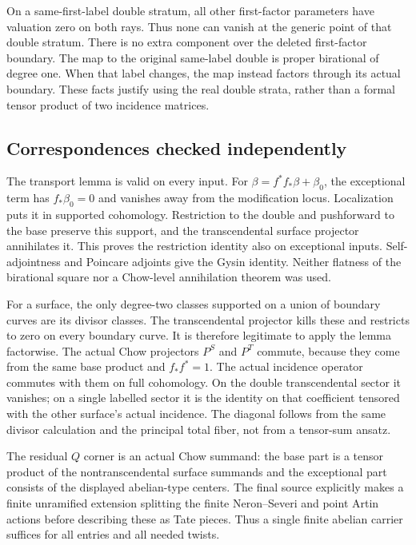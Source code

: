 On a same-first-label double stratum, all other first-factor
parameters have valuation zero on both rays.  Thus none can vanish
at the generic point of that double stratum.  There is no extra
component over the deleted first-factor boundary.  The map to the
original same-label double is proper birational of degree one.
When that label changes, the map instead factors through its actual
boundary.  These facts justify using the real double strata, rather
than a formal tensor product of two incidence matrices.

\subsection{Correspondences checked independently}

The transport lemma is valid on every input.  For
$\beta=f^*f_*\beta+\beta_0$, the exceptional term has
$f_*\beta_0=0$ and vanishes away from the modification locus.
Localization puts it in supported cohomology.  Restriction to the
double and pushforward to the base preserve this support, and the
transcendental surface projector annihilates it.  This proves the
restriction identity also on exceptional inputs.  Self-adjointness
and Poincare adjoints give the Gysin identity.  Neither flatness of
the birational square nor a Chow-level annihilation theorem was used.

For a surface, the only degree-two classes supported on a union of
boundary curves are its divisor classes.  The transcendental
projector kills these and restricts to zero on every boundary curve.
It is therefore legitimate to apply the lemma factorwise.
The actual Chow projectors $P^S$ and $P^T$ commute, because they
come from the same base product and $f_*f^*=1$.  The actual incidence
operator commutes with them on full cohomology.  On the double
transcendental sector it vanishes; on a single labelled sector it is
the identity on that coefficient tensored with the other surface's
actual incidence.  The diagonal follows from the same divisor
calculation and the principal total fiber, not from a tensor-sum
ansatz.

The residual $Q$ corner is an actual Chow summand: the base part is
a tensor product of the nontranscendental surface summands and the
exceptional part consists of the displayed abelian-type centers.
The final source explicitly makes a finite unramified extension
splitting the finite Neron--Severi and point Artin actions before
describing these as Tate pieces.  Thus a single finite abelian
carrier suffices for all entries and all needed twists.

